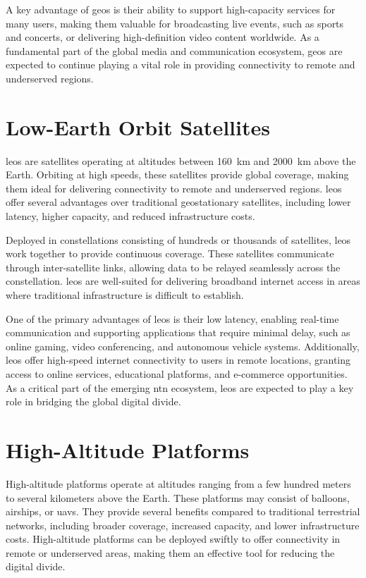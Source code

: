 A key advantage of \glspl{geo} is their ability to support high-capacity services for many users, making them valuable for broadcasting live events, such as sports and concerts, or delivering high-definition video content worldwide. As a fundamental part of the global media and communication ecosystem, \glspl{geo} are expected to continue playing a vital role in providing connectivity to remote and underserved regions.

\section{Low-Earth Orbit Satellites}

\glspl{leo} are satellites operating at altitudes between \SI{160}{\kilo\meter} and \SI{2000}{\kilo\meter} above the Earth. Orbiting at high speeds, these satellites provide global coverage, making them ideal for delivering connectivity to remote and underserved regions. \glspl{leo} offer several advantages over traditional geostationary satellites, including lower latency, higher capacity, and reduced infrastructure costs.

Deployed in constellations consisting of hundreds or thousands of satellites, \glspl{leo} work together to provide continuous coverage. These satellites communicate through inter-satellite links, allowing data to be relayed seamlessly across the constellation. \glspl{leo} are well-suited for delivering broadband internet access in areas where traditional infrastructure is difficult to establish.

One of the primary advantages of \glspl{leo} is their low latency, enabling real-time communication and supporting applications that require minimal delay, such as online gaming, video conferencing, and autonomous vehicle systems. Additionally, \glspl{leo} offer high-speed internet connectivity to users in remote locations, granting access to online services, educational platforms, and e-commerce opportunities. As a critical part of the emerging \gls{ntn} ecosystem, \glspl{leo} are expected to play a key role in bridging the global digital divide.

\section{High-Altitude Platforms}

High-altitude platforms operate at altitudes ranging from a few hundred meters to several kilometers above the Earth. These platforms may consist of balloons, airships, or \glspl{uav}. They provide several benefits compared to traditional terrestrial networks, including broader coverage, increased capacity, and lower infrastructure costs. High-altitude platforms can be deployed swiftly to offer connectivity in remote or underserved areas, making them an effective tool for reducing the digital divide.

